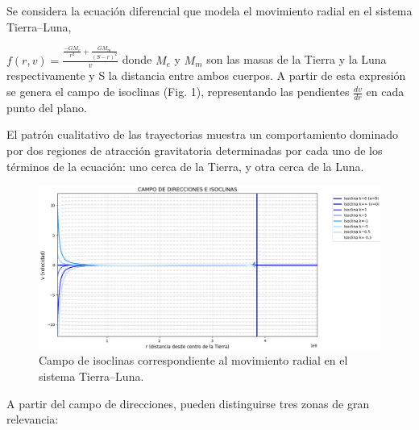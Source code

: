 \documentclass[a4paper,10pt,twocolumn]{article}
\begin{document}
Se considera la ecuación diferencial que modela el movimiento radial en el sistema Tierra–Luna,

$f(r,v)=\frac{\frac{-GM_e}{r^2}+\frac{GM_m}{(S-r)^2}}{v}$ donde $M_e$ y $M_m$ son las masas de la Tierra y la Luna respectivamente y S la distancia entre ambos cuerpos. A partir de esta expresión se genera el campo de isoclinas (Fig. 1), representando las pendientes $\frac{dv}{dr}$ en cada punto del plano. 


El patrón cualitativo de las trayectorias muestra un comportamiento dominado por dos regiones de atracción gravitatoria determinadas por cada uno de los términos de la ecuación: uno cerca de la Tierra, y otra cerca de la Luna.

  \begin{figure}
    \centering
    \includegraphics[width=1\linewidth]{isoclines.png}
    \caption{Campo de isoclinas correspondiente al movimiento radial en el sistema Tierra–Luna.}
    \label{fig:placeholder}
\end{figure}
A partir del campo de direcciones, pueden distinguirse tres zonas de gran relevancia:
\end{document}
